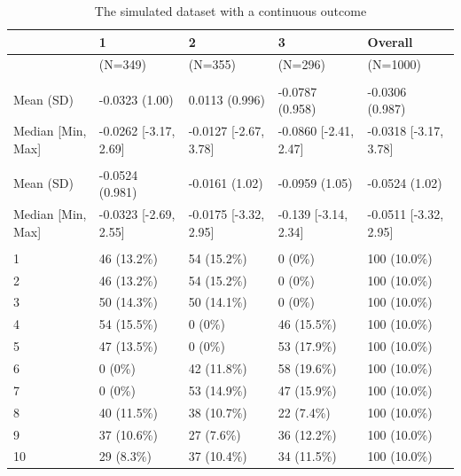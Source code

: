 \documentclass[
  letterpaper,
  DIV=11,
  numbers=noendperiod]{scrreprt}
\begin{document}
\hypertarget{tbl-nma-summary-continuous_outcome-data}{}
\begin{table}
\caption{\label{tbl-nma-summary-continuous_outcome-data}The simulated dataset with a continuous outcome }\tabularnewline

\centering
\begin{tabular}[t]{lllll}
\toprule
  & 1 & 2 & 3 & Overall\\
\midrule
 & (N=349) & (N=355) & (N=296) & (N=1000)\\
\addlinespace[0.3em]
\multicolumn{5}{l}{\textbf{z1}}\\
\hspace{1em}Mean (SD) & -0.0323 (1.00) & 0.0113 (0.996) & -0.0787 (0.958) & -0.0306 (0.987)\\
\hspace{1em}Median [Min, Max] & -0.0262 [-3.17, 2.69] & -0.0127 [-2.67, 3.78] & -0.0860 [-2.41, 2.47] & -0.0318 [-3.17, 3.78]\\
\addlinespace[0.3em]
\multicolumn{5}{l}{\textbf{z2}}\\
\hspace{1em}Mean (SD) & -0.0524 (0.981) & -0.0161 (1.02) & -0.0959 (1.05) & -0.0524 (1.02)\\
\hspace{1em}Median [Min, Max] & -0.0323 [-2.69, 2.55] & -0.0175 [-3.32, 2.95] & -0.139 [-3.14, 2.34] & -0.0511 [-3.32, 2.95]\\
\addlinespace[0.3em]
\multicolumn{5}{l}{\textbf{studyid}}\\
\hspace{1em}1 & 46 (13.2\%) & 54 (15.2\%) & 0 (0\%) & 100 (10.0\%)\\
\hspace{1em}2 & 46 (13.2\%) & 54 (15.2\%) & 0 (0\%) & 100 (10.0\%)\\
\hspace{1em}3 & 50 (14.3\%) & 50 (14.1\%) & 0 (0\%) & 100 (10.0\%)\\
\hspace{1em}4 & 54 (15.5\%) & 0 (0\%) & 46 (15.5\%) & 100 (10.0\%)\\
\hspace{1em}5 & 47 (13.5\%) & 0 (0\%) & 53 (17.9\%) & 100 (10.0\%)\\
\hspace{1em}6 & 0 (0\%) & 42 (11.8\%) & 58 (19.6\%) & 100 (10.0\%)\\
\hspace{1em}7 & 0 (0\%) & 53 (14.9\%) & 47 (15.9\%) & 100 (10.0\%)\\
\hspace{1em}8 & 40 (11.5\%) & 38 (10.7\%) & 22 (7.4\%) & 100 (10.0\%)\\
\hspace{1em}9 & 37 (10.6\%) & 27 (7.6\%) & 36 (12.2\%) & 100 (10.0\%)\\
\hspace{1em}10 & 29 (8.3\%) & 37 (10.4\%) & 34 (11.5\%) & 100 (10.0\%)\\
\bottomrule
\end{tabular}
\end{table}
\end{document}
